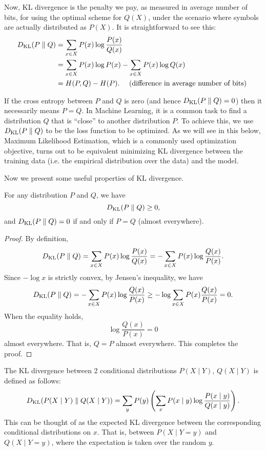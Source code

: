 \documentclass[a4paper]{article}
\begin{document}
Now, KL divergence is the penalty we pay, as measured in
average number of bits, for using the optimal scheme for
$Q(X)$, under the scenario where symbols are actually
distributed as $P(X)$. It is straightforward to see this:
\[
\begin{aligned}
  D_\text{KL}(P \; \Vert \; Q)
  &= \sum_{x \in X} P(x) \log \frac{P(x)}{Q(x)} \\
  &= \sum_{x \in X} P(x) \log P(x) - \sum_{x \in X}
  P(x) \log Q(x) \\
  &= H(P, Q) - H(P).
  \quad \text{ (difference in average number of bits) }
\end{aligned}
\]

If the cross entropy between $P$ and $Q$ is zero
(and hence $D_\text{KL}(P \; \Vert \; Q) = 0$) then it necessarily
means $P = Q$. In Machine Learning, it is a common
task to find a distribution $Q$ that is ``close'' to
another distribution $P$. To achieve this, we use
$D_\text{KL}(P \; \Vert \; Q)$ to be the loss function to be optimized.
As we will see in this below, Maximum Likelihood
Estimation, which is a commonly used optimization objective,
turns out to be equivalent minimizing KL divergence between
the training data (i.e. the empirical distribution over the
data) and the model.

Now we present some useful properties of KL divergence.

\begin{thm}
  For any distribution $P$ and $Q$, we have
  \[
  D_\text{KL}(P \; \Vert \; Q) \geq 0,
  \]
  and $D_\text{KL}(P \; \Vert \; Q) = 0$ if and only if $P = Q$ (almost
  everywhere).
\end{thm}

\begin{proof}
  By definition,
  \[
    D_\text{KL}(P \; \Vert \; Q) = \sum_{x \in X} P(x) \log \frac{P(x)}{Q(x)} = - \sum_{x \in X} P(x) \log \frac{Q(x)}{P(x)}.
  \]
  Since $-\log x$ is strictly convex, by Jensen's inequality, we have
  \[
  \begin{aligned}
    D_\text{KL}(P \; \Vert \; Q) = - \sum_{x \in X} P(x) \log \frac{Q(x)}{P(x)}
    \geq -\log \sum_{x \in X} P(x) \frac{Q(x)}{P(x)} = 0.
  \end{aligned}
  \]
  When the equality holds,
  \[
  \log \frac{Q(x)}{P(x)} = 0
  \]
  almost everywhere.
  That is, $Q = P$ almost everywhere.
  This completes the proof.
\end{proof}

\begin{defi}
  The KL divergence between 2 conditional distributions
  $P(X \mid Y)$, $Q(X \mid Y)$ is defined as follows:
  \[
  D_\text{KL}({P(X \mid Y)} \; \Vert \; {Q(X \mid Y)}) = \sum_y P(y)
  \left( \sum_x P(x \mid y) \log
  \frac{P(x \mid y)}{Q(x \mid y)} \right).
  \]
  This can be thought of as the expected KL divergence
  between the corresponding conditional distributions on
  $x$. That is, between $P(X \mid Y = y)$ and $Q(X \mid Y = y)$,
  where the expectation is taken over the random $y$.
\end{defi}
\end{document}
